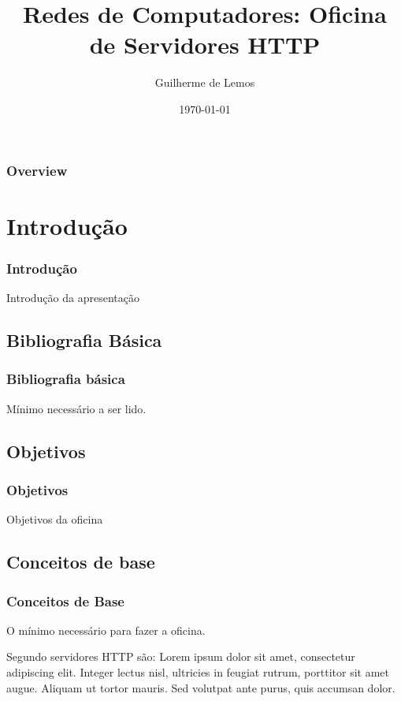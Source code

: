 \documentclass{beamer}
\title[Oficina: Servidores HTTP]{Redes de Computadores: Oficina de Servidores HTTP}
\author{Guilherme de Lemos} %
\institute[REDES] %
{
https://github.com/guilhermedelemos \\ %
\medskip
\textit{guilherme.eti@gmail.com}
}
\date{\today} %
\begin{document}
\begin{frame}
\titlepage %
\end{frame}

\begin{frame}
\frametitle{Overview} %
\tableofcontents %
\end{frame}


\section{Introdução}
\begin{frame}
\frametitle{Introdução}
Introdução da apresentação
\end{frame}

\subsection{Bibliografia Básica}
\begin{frame}
\frametitle{Bibliografia básica}
Mínimo necessário a ser lido.
\end{frame}

\subsection{Objetivos}
\begin{frame}
\frametitle{Objetivos}
Objetivos da oficina
\end{frame}

\subsection{Conceitos de base}
\begin{frame}
\frametitle{Conceitos de Base}
O mínimo necessário para fazer a oficina.

\begin{block}{Segundo \cite{p1} servidores HTTP são:}
Lorem ipsum dolor sit amet, consectetur adipiscing elit. Integer lectus nisl, ultricies in feugiat rutrum, porttitor sit amet augue. Aliquam ut tortor mauris. Sed volutpat ante purus, quis accumsan dolor.
\end{block}

\end{frame}
\end{document}
